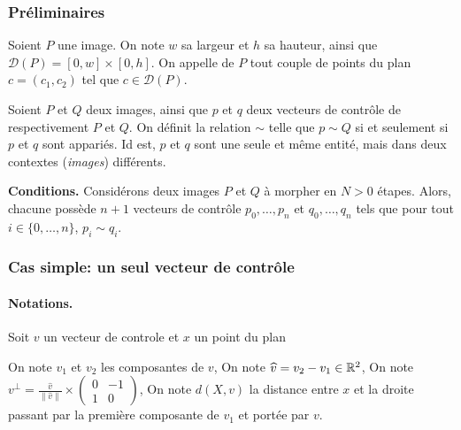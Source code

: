 \subsubsection{Préliminaires}
\begin{definition}
    Soient $P$ une image. On note $w$ sa largeur et $h$ sa hauteur, ainsi que $\mathcal{D}(P)=[0,w]\times[0,h]$.
    On appelle  de $P$ tout couple de points du plan $c=(c_1,c_2)$ tel que $c\in\mathcal{D}(P)$.
\end{definition}

\begin{definition}
    Soient $P$ et $Q$ deux images, ainsi que $p$ et $q$ deux vecteurs de contrôle de respectivement $P$ et $Q$. On définit la
    relation $\sim$ telle que $p \sim Q$ si et seulement si $p$ et $q$ sont appariés. Id est, $p$ et $q$ 
    sont une seule et même entité, mais dans deux contextes (\emph{images}) différents.
\end{definition}
\begin{coder}
    \textbf{Conditions.  } Considérons deux images $P$ et $Q$ à morpher en $N>0$ étapes. 
     Alors, chacune possède $n+1$ vecteurs de contrôle $p_{0},\dots,p_{n}$ et $q_{0},\dots,q_{n}$ tels que pour tout $i \in \{0,\dots,n\}$, $p_{i} \sim q_{i}$.

\end{coder}
\subsubsection{Cas simple: un seul vecteur de contrôle}
\paragraph{Notations.}
Soit $v$ un vecteur de controle et $x$ un point du plan
\begin{itemize}
    \flch On note $v_1$ et $v_2$ les composantes de $v$,
    \flch On note $\widehat{v} = v_2 - v_1 \in\mathbb{R}^2$,
    \flch On note $v^\perp = \frac{\widehat{v}}{\|\widehat{v}\|} \times \begin{pmatrix} 0 & -1 \\ 1 & 0 \end{pmatrix}$,
    \flch On note $d(X,v)$ la distance entre $x$ et la droite passant par la première composante de $v_1$ et portée par $v$.
\end{itemize}

